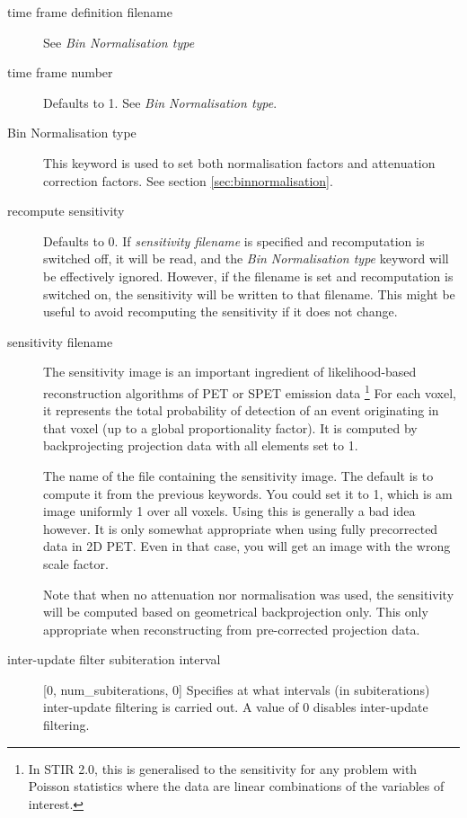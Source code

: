 \documentclass{article}
\begin{document}
\begin{description}
\item[time frame definition filename]
See \textit{Bin Normalisation type}

\item[time frame number]
Defaults to 1. See \textit{Bin Normalisation type}.

\item[Bin Normalisation type]
This keyword is used to set both normalisation factors and attenuation
correction factors. See section \ref{sec:binnormalisation}.

\item[recompute sensitivity]
Defaults to 0. If \textit{sensitivity filename} is specified and 
recomputation is switched off, it will be read, and the 
\textit{Bin Normalisation type} keyword will be effectively ignored.
However, if the filename is set and recomputation is switched on, the
sensitivity will be written to that filename. This might be useful
to avoid recomputing the sensitivity if it does not change.

\item[sensitivity filename]
The sensitivity image is an important ingredient of 
likelihood-based reconstruction algorithms of PET or SPET emission data
\footnote{In STIR 2.0, this is generalised to the sensitivity for
any problem with Poisson statistics where the data are linear
combinations of the variables of interest.}
For each voxel, it represents the total probability of detection of an 
event originating in that voxel (up to a global proportionality factor).
It is computed by backprojecting projection data with all elements set to 1.

The name of the file containing the sensitivity image. The 
default is to compute it from the previous keywords. You could 
set it to 1, which is am image uniformly 1 over all voxels. 
Using this is generally a bad idea however. It is 
only somewhat appropriate when using fully precorrected data 
in 2D PET. Even in that case, you will get an image with the 
wrong scale factor.

Note that when no attenuation nor normalisation was used, 
the sensitivity will be computed based on geometrical backprojection
only. This only appropriate when reconstructing 
from pre-corrected projection data.


\item[inter-update filter subiteration interval] [0, num\_subiterations, 0{]}
Specifies at what intervals (in subiterations) inter-update filtering 
is carried out. A value of 0 disables inter-update filtering.



\end{description}
\end{document}
